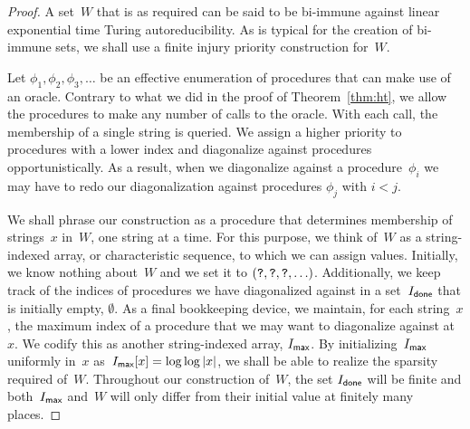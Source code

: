 \begin{proof}
  A set~$W$ that is as required can be said to be bi-immune against linear exponential time Turing autoreducibility.
  As is typical for the creation of bi-immune sets, we shall use a finite injury priority construction \parencite[see][Section~2.11]{downey2010algorithmic} for~$W$.

  Let $\phi_1, \phi_2, \phi_3, \ldots$ be an effective enumeration of procedures that can make use of an oracle.
  Contrary to what we did in the proof of Theorem~\ref{thm:ht}, we allow the procedures to make any number of calls to the oracle.
  With each call, the membership of a single string is queried.
  We assign a higher priority to procedures with a lower index and diagonalize against procedures opportunistically.
  As a result, when we diagonalize against a procedure~$\phi_i$ we may have to redo our diagonalization against procedures $\phi_j$ with $i < j$.

  We shall phrase our construction as a procedure that determines membership of strings~$x$ in~$W$, one string at a time.
  For this purpose, we think of~$W$ as a string-indexed array, or characteristic sequence, to which we can assign values.
  Initially, we know nothing about~$W$ and we set it to $(\textnormal{\texttt{?}}, \textnormal{\texttt{?}}, \textnormal{\texttt{?}}, \ldots)$.
  Additionally, we keep track of the indices of procedures we have diagonalized against in a set~$I_\textsf{done}$ that is initially empty, $\emptyset$.
  As a final bookkeeping device, we maintain, for each string~$x$, the maximum index of a procedure that we may want to diagonalize against at~$x$.
  We codify this as another string-indexed array, $I_\textsf{max}$.
  By initializing~$I_\textsf{max}$ uniformly in~$x$ as~$I_\textsf{max}[x] = \log \log {\lvert x\rvert}$, we shall be able to realize the sparsity required of~$W$.
  Throughout our construction of~$W$, the set $I_\textsf{done}$ will be finite and both~$I_\textsf{max}$ and~$W$ will only differ from their initial value at finitely many places.


\end{proof}
